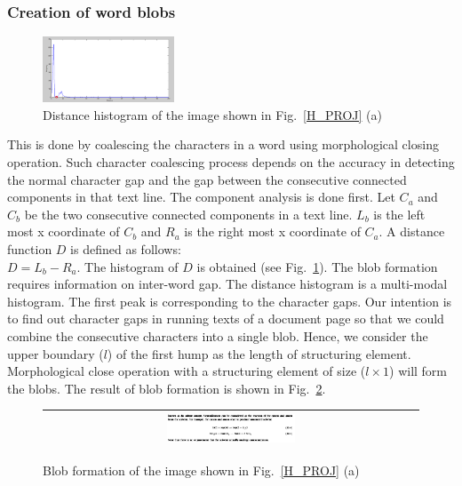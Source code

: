 \documentclass[conference]{IEEEtran}
\begin{document}
\subsubsection{Creation of word blobs}
\begin{figure}[h]\center\footnotesize
 \includegraphics[width=0.35\textwidth]{histogram.png} 
   \caption{Distance histogram of the image shown in Fig.~\ref{H_PROJ} (a) }
 \label{hist}
\end{figure}

This is done by coalescing the characters in a word using morphological closing operation. Such character coalescing process depends on the accuracy in detecting 
the normal character gap and the gap between the consecutive connected components in  that text line. The component analysis is done first. Let $C_a$ and $C_b$ be the two  consecutive connected components in a text line. $L_b$ is the left most x coordinate of $C_b$ and $R_a$ is the right most x coordinate of $C_a$. A distance function $D$ is defined as follows:\\ $D = L_b - R_a$. The histogram of $D$ is obtained (see Fig.~\ref{hist}). The blob formation requires information on inter-word gap. The distance histogram is a multi-modal histogram. The first peak is corresponding to the character gaps. Our intention is to find out character gaps in running texts 
of a document page so that we could combine the consecutive characters into a single blob. Hence, we consider the upper boundary ($l$) of the first hump as the length of structuring element. Morphological close operation with a structuring element of size ($l\times 1$) will form the blobs. The result of blob formation is shown in Fig.~\ref{BLOB_FORM}.
\begin{figure}[h]\center\footnotesize
\begin{tabular}{|c|}
\hline
 \includegraphics[width=0.35\textwidth]{blob.png} \\
 \hline
 \end{tabular} 
   \caption{Blob formation of the image shown in Fig.~\ref{H_PROJ} (a) }
 \label{BLOB_FORM}
\end{figure}
\end{document}
